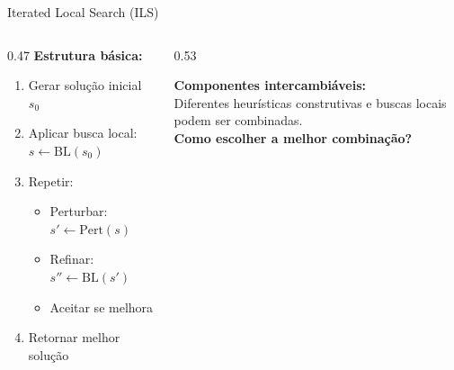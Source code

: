 \documentclass[11pt, xcolor=dvipsnames]{beamer}
\newcommand{\destaque}[1]{\textbf{\textcolor{verde}{#1}}}
\begin{document}
\begin{frame}{Iterated Local Search (ILS)}
  \footnotesize
  \begin{columns}[T]
    \begin{column}{0.47\textwidth}
      \textbf{Estrutura básica:}
      \begin{enumerate}
        \item Gerar solução inicial $s_0$
        \item Aplicar busca local: $s \leftarrow \text{BL}(s_0)$
        \item Repetir:
          \begin{itemize}
            \item Perturbar: $s' \leftarrow \text{Pert}(s)$
            \item Refinar: $s'' \leftarrow \text{BL}(s')$
            \item Aceitar se melhora
          \end{itemize}
        \item Retornar melhor solução
      \end{enumerate}
    \end{column}
    \begin{column}{0.53\textwidth}
      \begin{calloutbox}
        {\scriptsize
        \textbf{Componentes intercambiáveis:} \\[1mm]
        Diferentes heurísticas construtivas e buscas locais podem ser combinadas. \\[2mm]
        \destaque{Como escolher a melhor combinação?}
        }
      \end{calloutbox}
    \end{column}
  \end{columns}
\end{frame}
\end{document}
